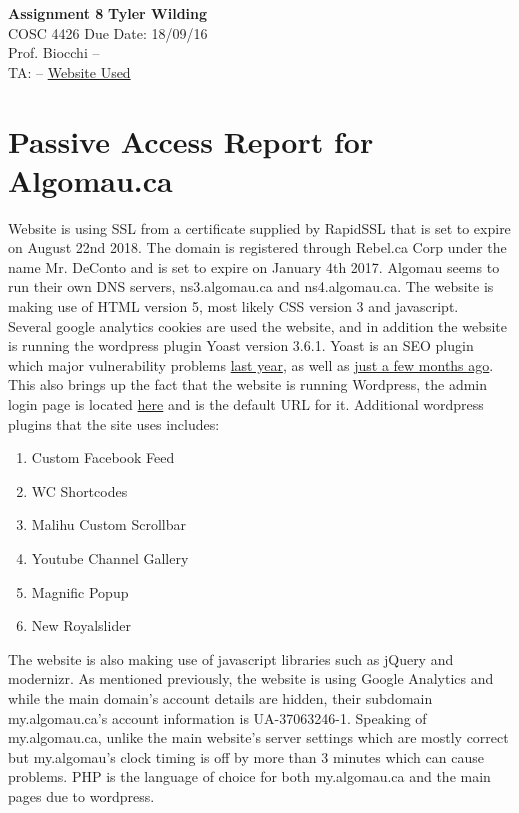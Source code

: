 \documentclass[a4paper, 11pt]{article}
\begin{document}
\noindent
\large\textbf{Assignment 8} \hfill \textbf{Tyler Wilding} \\
\normalsize COSC 4426 \hfill Due Date: 18/09/16 \\
Prof. Biocchi \hfill -- \\
TA: -- \hfill \href{http://www.algomau.ca}{Website Used}

\section*{Passive Access Report for Algomau.ca}

Website is using SSL from a certificate supplied by RapidSSL that is set to expire on August 22nd 2018.  The domain is registered through Rebel.ca Corp under the name Mr. DeConto and is set to expire on January 4th 2017.  Algomau seems to run their own DNS servers, ns3.algomau.ca and ns4.algomau.ca.  The website is making use of HTML version 5, most likely CSS version 3 and javascript.\\

Several google analytics cookies are used the website, and in addition the website is running the wordpress plugin Yoast version 3.6.1.  Yoast is an SEO plugin which major vulnerability problems \href{http://thehackernews.com/2015/03/wordpress-seo-by-yoast-plugin.html}{last year}, as well as \href{https://www.wordfence.com/blog/2016/05/yoast-seo-vulnerability/}{just a few months ago}.  This also brings up the fact that the website is running Wordpress, the admin login page is located \href{www.algomau.ca/wp-admin}{here} and is the default URL for it. Additional wordpress plugins that the site uses includes:

\begin{enumerate}
\item Custom Facebook Feed
\item WC Shortcodes
\item Malihu Custom Scrollbar
\item Youtube Channel Gallery
\item Magnific Popup
\item New Royalslider
\end{enumerate}

The website is also making use of javascript libraries such as jQuery and modernizr.  As mentioned previously, the website is using Google Analytics and while the main domain's account details are hidden, their subdomain my.algomau.ca's account information is UA-37063246-1.  Speaking of my.algomau.ca, unlike the main website's server settings which are mostly correct but my.algomau's clock timing is off by more than 3 minutes which can cause problems.  PHP is the language of choice for both my.algomau.ca and the main pages due to wordpress.  
\end{document}
